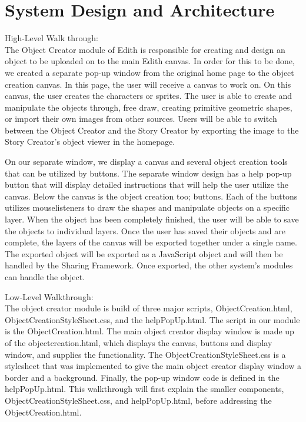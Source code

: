 \documentclass[a4paper, 11pt]{article} %
\begin{document}

\section*{System Design and Architecture}
High-Level Walk through:\\

The Object Creator module of Edith is responsible for creating and design an object to be uploaded on to the main Edith canvas. In order for this to be done, we created a separate pop-up window from the original home page to the object creation canvas. In this page, the user will receive a canvas to work on. On this canvas, the user creates the characters or sprites. The user is able to create and manipulate the objects through, free draw, creating primitive geometric shapes, or import their own images from other sources. Users will be able to switch between the Object Creator and the Story Creator by exporting the image to the Story Creator’s object viewer in the homepage. 

On our separate window, we display a canvas and several object creation tools that can be utilized by buttons. The separate window design has a help pop-up button that will display detailed instructions that will help the user utilize the canvas. Below the canvas is the object creation too; buttons. Each of the buttons utilizes mouselisteners to draw the shapes and manipulate objects on a specific layer. When the object has been completely finished, the user will be able to save the objects to individual layers. Once the user has saved their objects and are complete, the layers of the canvas will be exported together under a single name. The exported object will be exported as a JavaScript object and will then be handled by the Sharing Framework.  Once exported, the other system’s modules can handle the object. 


Low-Level Walkthrough:\\

The object creator module is build of three major scripts, ObjectCreation.html, ObjectCreationStyleSheet.css, and the helpPopUp.html. The script in our module is the ObjectCreation.html. The main object creator display window is made up of the objectcreation.html, which displays the canvas, buttons and display window, and supplies the functionality.  The ObjectCreationStyleSheet.css is a stylesheet that was implemented to give the main object creator display window a border and a background. Finally, the pop-up window code is defined in the helpPopUp.html. This walkthrough will first explain the smaller components, ObjectCreationStyleSheet.css, and helpPopUp.html, before addressing the ObjectCreation.html.
\end{document}
